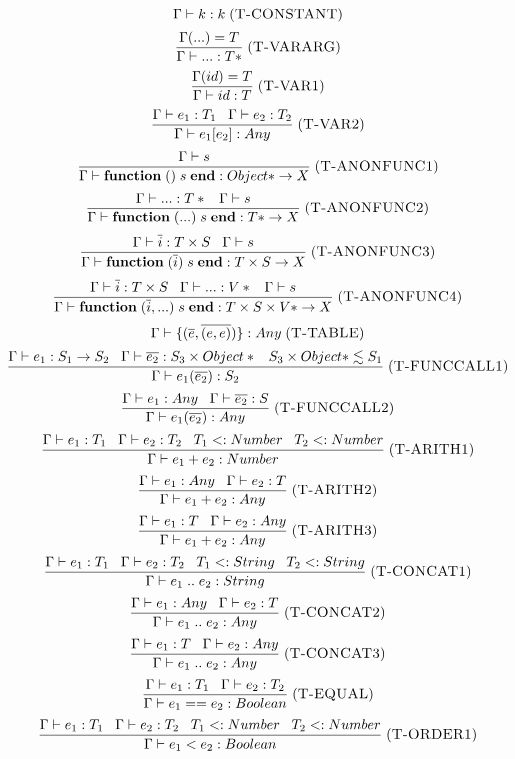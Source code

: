 \documentclass[12pt]{article}
\newcommand{\mylabel}[1]{\; (\textsc{#1})}
\newcommand{\subtype}{<:}
\newcommand{\env}{\Gamma}
\begin{document}
\[
\env \vdash k : k
\mylabel{T-CONSTANT}
\]
\[
\frac{\env({...}) = T}
     {\env \vdash {...} : T*}
\mylabel{T-VARARG}
\]
\[
\frac{\env(id) = T}
     {\env \vdash id : T}
\mylabel{T-VAR1}
\]
\[
\frac{\env \vdash e_{1}:T_{1} \;\;\; \env \vdash e_{2}:T_{2}}
     {\env \vdash e_{1}[e_{2}] : Any}
\mylabel{T-VAR2}
\]
\[
\frac{\env \vdash s}
     {\env \vdash \mathbf{function} \; () \; s \; \mathbf{end} :
      {Object*} \rightarrow X}
\mylabel{T-ANONFUNC1}
\]
\[
\frac{\env \vdash {...}:T* \;\;\; \env \vdash s}
     {\env \vdash \mathbf{function} \; ({...}) \; s \; \mathbf{end} :
      {T*} \rightarrow X}
\mylabel{T-ANONFUNC2}
\]
\[
\frac{\env \vdash \overline{i}:T \times S \;\;\; \env \vdash s}
     {\env \vdash \mathbf{function} \; (\overline{i}) \; s \; \mathbf{end} :
      T \times S \rightarrow X}
\mylabel{T-ANONFUNC3}
\]
\[
\frac{\env \vdash \overline{i}:T \times S \;\;\; \env \vdash {...}:V* \;\;\;
      \env \vdash s}
     {\env \vdash \mathbf{function} \; (\overline{i}, {...}) \; s
      \; \mathbf{end} : T \times S \times {V*} \rightarrow X}
\mylabel{T-ANONFUNC4}
\]
\[
\env \vdash \{(\overline{e},\overline{(e,e)})\} : Any
\mylabel{T-TABLE}
\]
\[
\frac{\env \vdash e_{1}:S_{1} \rightarrow S_{2} \;\;\;
      \env \vdash \overline{e_{2}}:S_{3} \times Object* \;\;\;
      S_{3} \times Object* \lesssim S_{1}}
     {\env \vdash e_{1}(\overline{e_{2}}) : S_{2}}
\mylabel{T-FUNCCALL1}
\]
\[
\frac{\env \vdash e_{1}:Any \;\;\; \env \vdash \overline{e_{2}}:S}
     {\env \vdash e_{1}(\overline{e_{2}}) : Any}
\mylabel{T-FUNCCALL2}
\]
\[
\frac{\env \vdash e_{1}:T_{1} \;\;\; \env \vdash e_{2}:T_{2} \;\;\;
      T_{1} \subtype Number \;\;\; T_{2} \subtype Number}
     {\env \vdash e_{1} + e_{2} : Number}
\mylabel{T-ARITH1}
\]
\[
\frac{\env \vdash e_{1}:Any \;\;\; \env \vdash e_{2}:T}
     {\env \vdash e_{1} + e_{2} : Any}
\mylabel{T-ARITH2}
\]
\[
\frac{\env \vdash e_{1}:T \;\;\; \env \vdash e_{2}:Any}
     {\env \vdash e_{1} + e_{2} : Any}
\mylabel{T-ARITH3}
\]
\[
\frac{\env \vdash e_{1}:T_{1} \;\;\; \env \vdash e_{2}:T_{2} \;\;\;
      T_{1} \subtype String \;\;\; T_{2} \subtype String}
     {\env \vdash e_{1} \; {..} \;  e_{2} : String}
\mylabel{T-CONCAT1}
\]
\[
\frac{\env \vdash e_{1}:Any \;\;\; \env \vdash e_{2}:T}
     {\env \vdash e_{1} \; {..} \; e_{2} : Any}
\mylabel{T-CONCAT2}
\]
\[
\frac{\env \vdash e_{1}:T \;\;\; \env \vdash e_{2}:Any}
     {\env \vdash e_{1} \; {..} \; e_{2} : Any}
\mylabel{T-CONCAT3}
\]
\[
\frac{\env \vdash e_{1}:T_{1} \;\;\; \env \vdash e_{2}:T_{2}}
     {\env \vdash e_{1} == e_{2} : Boolean}
\mylabel{T-EQUAL}
\]
\[
\frac{\env \vdash e_{1}:T_{1} \;\;\; \env \vdash e_{2}:T_{2} \;\;\;
      T_{1} \subtype Number \;\;\; T_{2} \subtype Number}
     {\env \vdash e_{1} < e_{2} : Boolean}
\mylabel{T-ORDER1}
\]
\end{document}

